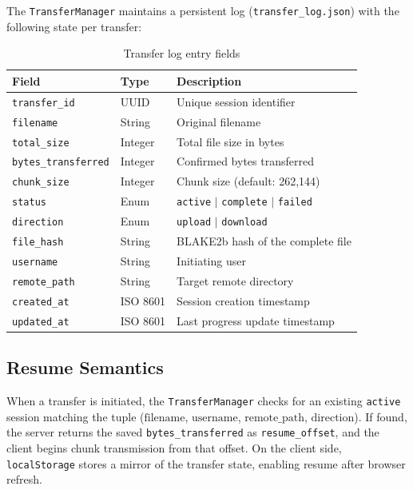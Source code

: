 \documentclass[12pt, a4paper]{article}
\begin{document}
The \texttt{TransferManager} maintains a persistent log (\texttt{transfer\_log.json}) with the following state per transfer:

\begin{table}[H]
    \centering
    \caption{Transfer log entry fields}
    \label{tab:transfer}
    \begin{tabularx}{\textwidth}{l l X}
        \toprule
        \textbf{Field} & \textbf{Type} & \textbf{Description} \\
        \midrule
        \texttt{transfer\_id} & UUID & Unique session identifier \\
        \texttt{filename} & String & Original filename \\
        \texttt{total\_size} & Integer & Total file size in bytes \\
        \texttt{bytes\_transferred} & Integer & Confirmed bytes transferred \\
        \texttt{chunk\_size} & Integer & Chunk size (default: 262,144) \\
        \texttt{status} & Enum & \texttt{active} $|$ \texttt{complete} $|$ \texttt{failed} \\
        \texttt{direction} & Enum & \texttt{upload} $|$ \texttt{download} \\
        \texttt{file\_hash} & String & BLAKE2b hash of the complete file \\
        \texttt{username} & String & Initiating user \\
        \texttt{remote\_path} & String & Target remote directory \\
        \texttt{created\_at} & ISO 8601 & Session creation timestamp \\
        \texttt{updated\_at} & ISO 8601 & Last progress update timestamp \\
        \bottomrule
    \end{tabularx}
\end{table}

\subsection{Resume Semantics}

When a transfer is initiated, the \texttt{TransferManager} checks for an existing \texttt{active} session matching the tuple ($\text{filename}$, $\text{username}$, $\text{remote\_path}$, $\text{direction}$). If found, the server returns the saved \texttt{bytes\_transferred} as \texttt{resume\_offset}, and the client begins chunk transmission from that offset. On the client side, \texttt{localStorage} stores a mirror of the transfer state, enabling resume after browser refresh.
\end{document}
